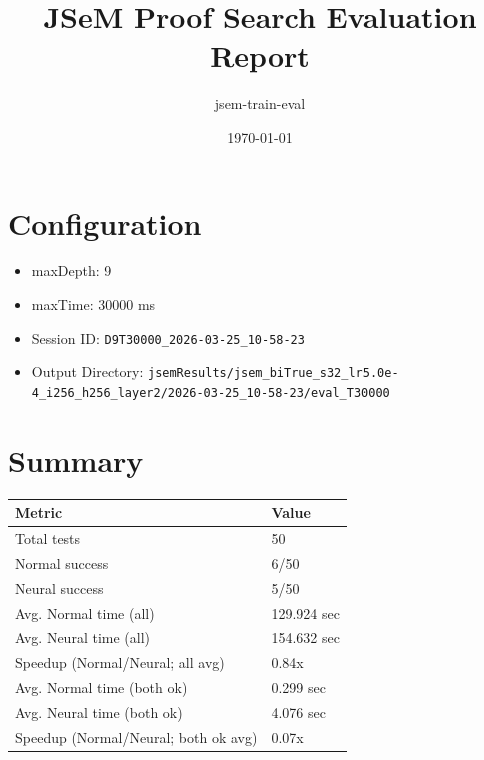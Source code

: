\documentclass[a4paper,10pt]{article}
\title{JSeM Proof Search Evaluation Report}
\author{jsem-train-eval}
\date{\today}
\begin{document}
\maketitle

\section{Configuration}
\begin{itemize}
\item maxDepth: 9
\item maxTime: 30000 ms
\item Session ID: \texttt{D9T30000\_2026-03-25\_10-58-23}
\item Output Directory: \texttt{jsemResults/jsem\_biTrue\_s32\_lr5.0e-4\_i256\_h256\_layer2/2026-03-25\_10-58-23/eval\_T30000}
\end{itemize}

\section{Summary}
\begin{tabular}{ll}
\toprule
\textbf{Metric} & \textbf{Value} \\
\midrule
Total tests & 50 \\
Normal success & 6/50 \\
Neural success & 5/50 \\
\midrule
Avg. Normal time (all) & 129.924 sec \\
Avg. Neural time (all) & 154.632 sec \\
Speedup (Normal/Neural; all avg) & 0.84x \\
Avg. Normal time (both ok) & 0.299 sec \\
Avg. Neural time (both ok) & 4.076 sec \\
Speedup (Normal/Neural; both ok avg) & 0.07x \\
\bottomrule
\end{tabular}
\end{document}
